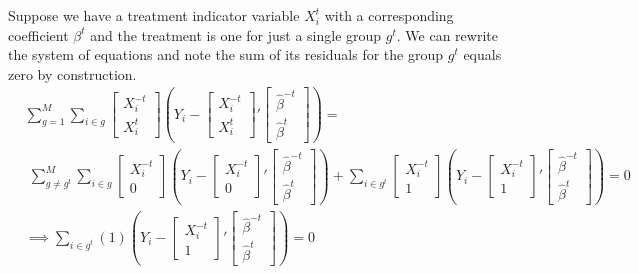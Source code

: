 \documentclass[12pt]{article}
\begin{document}
Suppose we have a treatment indicator variable $X_i^t$ with a corresponding coefficient $\beta^t$ and the treatment is one for just a single group $g^t$. We can rewrite the system of equations and note the sum of its residuals for the group $g^t$ equals zero by construction. 
\begin{align*}
& \sum_{g=1}^{M} \sum_{i \in g} \begin{bmatrix}
X_i^{-t} \\  X_i^t 
\end{bmatrix}(Y_i - \begin{bmatrix}
X_i^{-t} \\  X_i^t 
\end{bmatrix}' \begin{bmatrix}
\hat{\beta}^{-t} \\ \hat{\beta}^t 
\end{bmatrix}) = \\  & \; \sum_{g\ne g^t}^{M} \sum_{i \in g} \begin{bmatrix}
X_i^{-t} \\  0 
\end{bmatrix}(Y_i - \begin{bmatrix}
X_i^{-t} \\  0 
\end{bmatrix}' \begin{bmatrix}
\hat{\beta}^{-t} \\ \hat{\beta}^t 
\end{bmatrix}) + \sum_{i \in g^t} \begin{bmatrix}
X_i^{-t} \\  1 
\end{bmatrix}(Y_i - \begin{bmatrix}
X_i^{-t} \\  1 
\end{bmatrix}' \begin{bmatrix}
\hat{\beta}^{-t} \\ \hat{\beta}^t 
\end{bmatrix}) = 0 \\
& \implies \sum_{i \in g^t} (1) 
(Y_i - \begin{bmatrix}
X_i^{-t} \\  1 
\end{bmatrix}' \begin{bmatrix}
\hat{\beta}^{-t} \\ \hat{\beta}^t 
\end{bmatrix}) = 0
\end{align*}
\end{document}
